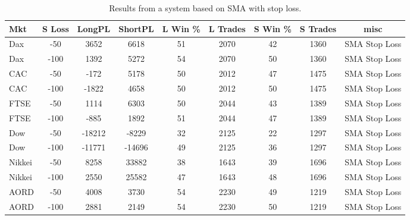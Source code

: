 \begin{table}[ht]
\centering
\caption[Results from a system based on SMA with stop loss]{Results from a system based on SMA with stop loss.} 
\label{tab:sma_results_Sloss}
\begin{tabular}{lcccccccc}
  \toprule Mkt & S Loss & LongPL & ShortPL & L Win \% & L Trades & S Win \% & S Trades & misc \\ 
  \midrule Dax & -50 & 3652 & 6618 & 51 & 2070 & 42 & 1360 & SMA Stop Loss \\ 
  Dax & -100 & 1392 & 5272 & 54 & 2070 & 50 & 1360 & SMA Stop Loss \\ 
  CAC & -50 & -172 & 5178 & 50 & 2012 & 47 & 1475 & SMA Stop Loss \\ 
  CAC & -100 & -1822 & 4658 & 50 & 2012 & 50 & 1475 & SMA Stop Loss \\ 
  FTSE & -50 & 1114 & 6303 & 50 & 2044 & 43 & 1389 & SMA Stop Loss \\ 
  FTSE & -100 & -885 & 1892 & 51 & 2044 & 47 & 1389 & SMA Stop Loss \\ 
  Dow & -50 & -18212 & -8229 & 32 & 2125 & 22 & 1297 & SMA Stop Loss \\ 
  Dow & -100 & -11771 & -14696 & 49 & 2125 & 36 & 1297 & SMA Stop Loss \\ 
  Nikkei & -50 & 8258 & 33882 & 38 & 1643 & 39 & 1696 & SMA Stop Loss \\ 
  Nikkei & -100 & 2550 & 25582 & 47 & 1643 & 48 & 1696 & SMA Stop Loss \\ 
  AORD & -50 & 4008 & 3730 & 54 & 2230 & 49 & 1219 & SMA Stop Loss \\ 
  AORD & -100 & 2881 & 2149 & 54 & 2230 & 50 & 1219 & SMA Stop Loss \\ 
   \bottomrule \end{tabular}
\end{table}
